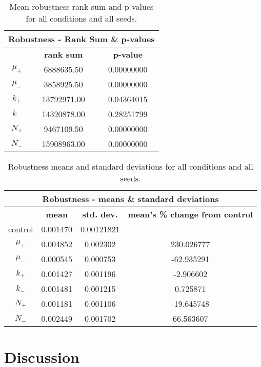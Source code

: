 \begin{table}
	\begin{tabular}{|c|c|c|}
		\hline
		\multicolumn{3}{c}{\Large \textbf{Robustness - Rank Sum \& p-values}} \\
		\hline
		& \textbf{rank sum} & \textbf{p-value} \\
		\hline
		$\mu_+$ & 6888635.50 & 0.00000000 \\ 
		\hline
		$\mu_-$ & 3858925.50 & 0.00000000 \\ 
		\hline
		$k_+$ & 13792971.00 & 0.04364015 \\ 
		\hline
		$k_-$ & 14320878.00 & 0.28251799 \\ 
		\hline
		$N_+$ & 9467109.50 & 0.00000000 \\ 
		\hline
		$N_-$ & 15908963.00 & 0.00000000 \\ 
		\hline
	\end{tabular}
	\caption[Robustness rank sum \& p-values]{Mean robustness rank sum and p-values for all conditions and all seeds.}
	\label{table:robustness_rank_sum_p-values}
\end{table}

\begin{table}[H]
	\begin{tabular}{|c|c|c|c|}
		\hline
		\multicolumn{4}{c}{\Large \textbf{Robustness - means \& standard deviations}} \\
		\hline
		& \textbf{mean} & \textbf{std. dev.} & \textbf{mean's \% change from control} \\
		\hline
		control & 0.001470 & 0.00121821 & \textemdash \\ 
		\hline
		$\mu_+$ & 0.004852 & 0.002302 & 230.026777 \\ 
		\hline
		$\mu_-$ & 0.000545 & 0.000753 & -62.935291 \\ 
		\hline
		$k_+$ & 0.001427 & 0.001196 & -2.906602 \\ 
		\hline
		$k_-$ & 0.001481 & 0.001215 & 0.725871 \\ 
		\hline
		$N_+$ & 0.001181 & 0.001106 & -19.645748 \\ 
		\hline
		$N_-$ & 0.002449 & 0.001702 & 66.563607 \\ 
		\hline
	\end{tabular}
	\caption[Robustness means and standard deviations]{Robustness means and standard deviations for all conditions and all seeds.}
	\label{table:robustness_means_and_std_dev}
\end{table}

\section{Discussion}\label{discussion}

